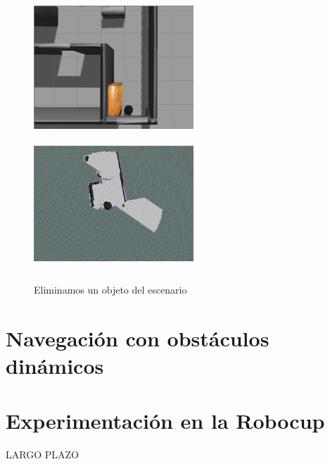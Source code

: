 \begin{figure}[H]
  \begin{center}
    \includegraphics[width=6cm,height=5cm]{img/cap5/incrementmap2}
    \includegraphics[width=6cm,height=5cm]{img/cap5/incrementmap-object2}
  \end{center}
  \caption{Eliminamos un objeto del escenario}
  \label{fig:deleteobject}
\end{figure}

\section {Navegación con obstáculos dinámicos}
\label{cap:navegacionconobstaculos}

\section {Experimentación en la Robocup}
\label{cap:experimentacionrobocup}




LARGO PLAZO

